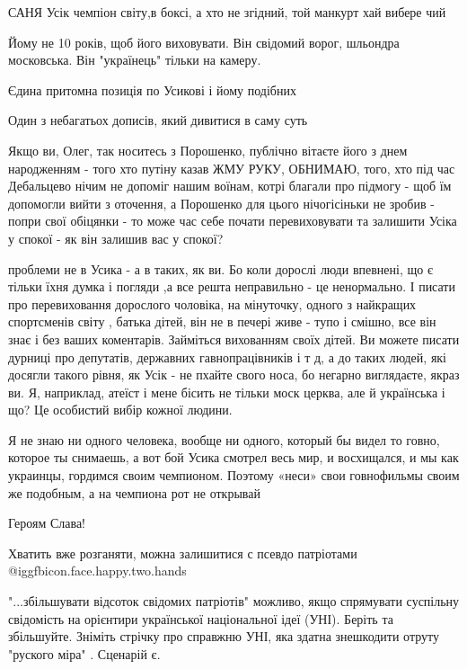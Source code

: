 \begin{itemize}
САНЯ Усік чемпіон світу,в боксі, а хто не згідний, той манкурт хай вибере чий

Йому не 10 років, щоб його виховувати. Він свідомий ворог, шльондра московська.
Він "українець" тільки на камеру.

Єдина притомна позиція по Усикові і йому подібних

Один з небагатьох дописів, який дивитися в саму суть


Якщо ви, Олег, так носитесь з Порошенко, публічно вітаєте його з днем
народженням - того хто путіну казав ЖМУ РУКУ, ОБНИМАЮ, того, хто під час
Дебальцево нічим не допоміг нашим воїнам, котрі благали про підмогу - щоб їм
допомогли вийти з оточення, а Порошенко для цього нічогісіньки не зробив -
попри свої обіцянки - то може час себе почати перевиховувати та залишити Усіка
у спокої - як він залишив вас у спокої?



проблеми не в Усика - а в таких, як ви. Бо коли дорослі люди впевнені, що є
тільки їхня думка і погляди ,а все решта неправильно - це ненормально. І писати
про перевиховання дорослого чоловіка, на мінуточку, одного з найкращих
спортсменів світу , батька дітей, він не в печері живе - тупо і смішно, все він
знає і без ваших коментарів. Займіться вихованням своїх дітей. Ви можете писати
дурниці про депутатів, державних гавнопрацівників і т д, а до таких людей, які
досягли такого рівня, як Усік - не пхайте свого носа, бо негарно виглядаєте,
якраз ви. Я, наприклад, атеїст і мене бісить не тільки моск церква, але й
українська і що? Це особистий вибір кожної людини.


Я не знаю ни одного человека, вообще ни одного, который бы видел то говно,
которое ты снимаешь, а вот бой Усика смотрел весь мир, и восхищался, и мы как
украинцы, гордимся своим чемпионом. Поэтому «неси» свои говнофильмы своим же
подобным, а на чемпиона рот не открывай

Героям Слава!

Хватить вже розганяти, можна залишитися с псевдо патріотами @igg{fbicon.face.happy.two.hands} 


"...збільшувати відсоток свідомих патріотів" можливо, якщо спрямувати суспільну
свідомість на орієнтири української національної ідеї (УНІ). Беріть та
збільшуйте. Зніміть стрічку про справжню УНІ, яка здатна знешкодити отруту
"руского міра" . Сценарій є.


\end{itemize}
